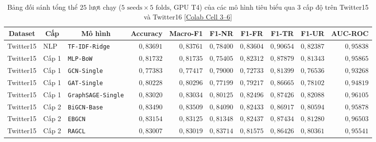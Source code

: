 \documentclass[11pt,a4paper]{extreport}
\newcommand{\ghrepo}{https://github.com/pqui-345/BiGCN-Plus-Rumor-Detection/blob/main}
\newcommand{\coderef}[2]{\textnormal{[\href{\ghrepo/#1}{#2}]}}
\begin{document}
\begin{table}[htbp]
    \centering
    \caption[Bảng đối sánh tổng thể 25 lượt các mô hình tiêu biểu qua 3 cấp độ]{Bảng đối sánh tổng thể $25$ lượt chạy ($5\text{ seeds} \times 5\text{ folds}$, GPU T4) của các mô hình tiêu biểu qua 3 cấp độ trên Twitter15 và Twitter16 \coderef{scripts/CT255_RumorDetection_BiGCN_Plus_MultiSeed_5x5_Colab_T4GPU.ipynb}{Colab Cell 3--6}}
    \label{tab:master-comparison}
    \scriptsize
    \setlength{\tabcolsep}{3.2pt}
    \begin{tabular}{@{}lllrrrrrrr@{}}
        \toprule
        \multicolumn{1}{c}{\textbf{Dataset}} & \multicolumn{1}{c}{\textbf{Cấp}} & \multicolumn{1}{c}{\textbf{Mô hình}} & \multicolumn{1}{c}{\textbf{Accuracy}} & \multicolumn{1}{c}{\textbf{Macro-F1}} & \multicolumn{1}{c}{\textbf{F1-NR}} & \multicolumn{1}{c}{\textbf{F1-FR}} & \multicolumn{1}{c}{\textbf{F1-TR}} & \multicolumn{1}{c}{\textbf{F1-UR}} & \multicolumn{1}{c}{\textbf{AUC-ROC}} \\
        \midrule
        Twitter15 & NLP   & \texttt{TF-IDF-Ridge}      & $0{,}83691$ & $0{,}83761$ & $0{,}78400$ & $0{,}83604$ & $0{,}90654$ & $0{,}82387$ & $0{,}95838$ \\
        Twitter15 & Cấp 1 & \texttt{MLP-BoW}           & $0{,}81732$ & $0{,}81735$ & $0{,}75405$ & $0{,}82312$ & $0{,}87879$ & $0{,}81343$ & $0{,}95865$ \\
        Twitter15 & Cấp 1 & \texttt{GCN-Single}        & $0{,}77383$ & $0{,}77417$ & $0{,}79000$ & $0{,}72733$ & $0{,}81399$ & $0{,}76536$ & $0{,}93268$ \\
        Twitter15 & Cấp 1 & \texttt{GAT-Single}        & $0{,}80228$ & $0{,}80296$ & $0{,}77199$ & $0{,}79217$ & $0{,}86665$ & $0{,}78102$ & $0{,}94819$ \\
        Twitter15 & Cấp 1 & \texttt{GraphSAGE-Single}  & $0{,}83020$ & $0{,}83034$ & $0{,}80125$ & $0{,}82496$ & $0{,}87426$ & $0{,}82088$ & $0{,}96105$ \\
        Twitter15 & Cấp 2 & \texttt{BiGCN-Base}        & $0{,}83490$ & $0{,}83509$ & $0{,}84090$ & $0{,}82433$ & $0{,}86917$ & $0{,}80594$ & $0{,}95878$ \\
        Twitter15 & Cấp 2 & \texttt{EBGCN}             & $0{,}83154$ & $0{,}83125$ & $0{,}81348$ & $0{,}82437$ & $0{,}87434$ & $0{,}81280$ & $0{,}96503$ \\
        Twitter15 & Cấp 2 & \texttt{RAGCL}             & $0{,}83007$ & $0{,}83019$ & $0{,}83714$ & $0{,}81575$ & $0{,}86426$ & $0{,}80361$ & $0{,}95541$ \\

\end{tabular}
\end{table}
\end{document}
